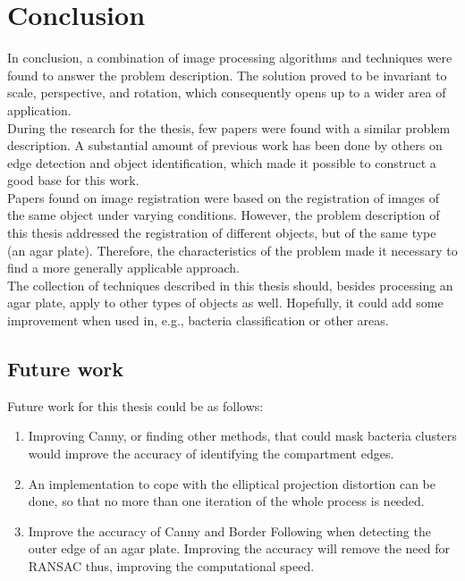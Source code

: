 
\chapter{Conclusion}
\label{cha:conclusion}
In conclusion, a combination of image processing algorithms and techniques were found to answer the problem description. The solution proved to be invariant to scale, perspective, and rotation, which consequently opens up to a wider area of application. \\

\noindent During the research for the thesis, few papers were found with a similar problem description. A substantial amount of previous work has been done by others on edge detection and object identification, which made it possible to construct a good base for this work. \\

\noindent Papers found on image registration were based on the registration of images of the same object under varying conditions. However, the problem description of this thesis addressed the registration of different objects, but of the same type (an agar plate). Therefore, the characteristics of the problem made it necessary to find a more generally applicable approach. \\ 

\noindent The collection of techniques described in this thesis should, besides processing an agar plate, apply to other types of objects as well. Hopefully, it could add some improvement when used in, e.g., bacteria classification or other areas.

\section{Future work}
Future work for this thesis could be as follows: 
\begin{enumerate}
    \item Improving Canny, or finding other methods, that could mask bacteria clusters would improve the accuracy of identifying the compartment edges. 
    \item An implementation to cope with the elliptical projection distortion can be done, so that no more than one iteration of the whole process is needed. 
    \item Improve the accuracy of Canny and Border Following when detecting the outer edge of an agar plate. Improving the accuracy will remove the need for RANSAC thus, improving the computational speed. 
\end{enumerate}



